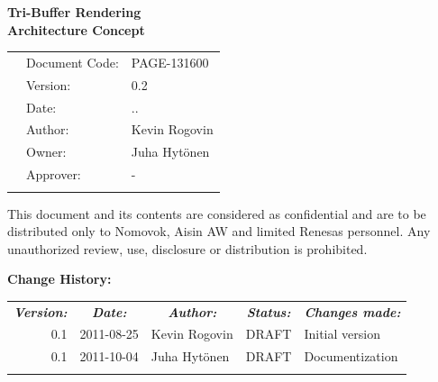 \documentclass[a4paper,11pt]{article}
\renewcommand{\dateseparator}{.}
\newcommand{\todayiso}{\twodigit\day\dateseparator\twodigit\month\dateseparator\the\year}
\begin{document}
\begin{center}

\vspace*{105.5pt}
{\LARGE \bf Tri-Buffer Rendering}\\
{\LARGE \bf Architecture Concept}\\
\vspace{71pt}

{
\begin{tabular}{lll}
  &Document Code: & PAGE-131600 \\ 
  &Version: & 0.2 \\ 
  &Date: & \todayiso \\ 
  &Author: & Kevin Rogovin \\ 
  &Owner: & Juha Hytönen \\ 
  &Approver: & - \\
  \multicolumn{1}{p{3.83cm}}{} &
  \multicolumn{1}{p{4.17cm}}{} & 
  \multicolumn{1}{p{8.00cm}}{}\\
\end{tabular}
}

\small
This document and its contents are considered as confidential and are to be distributed only to Nomovok, Aisin AW and limited Renesas personnel. 
Any unauthorized review, use, disclosure or distribution is prohibited. 

\end{center}

\newpage

\noindent\textbf{Change History:}
\label{sec:changelog}
\begin{table}[h!tbp]
  \begin{tabular}{rllll}
    \multicolumn{1}{c}{\textbf{\textit{Version:}}}& 
    \multicolumn{1}{c}{\textbf{\textit{Date:}}} & 
    \multicolumn{1}{c}{\textbf{\textit{Author:}}} &
    \multicolumn{1}{c}{\textbf{\textit{Status:}}} &
    \multicolumn{1}{c}{\textbf{\textit{Changes made:}}}\\
    0.1 & 2011-08-25 & Kevin Rogovin & DRAFT & Initial version \\
    0.1 & 2011-10-04 & Juha Hytönen & DRAFT & Documentization \\
    \multicolumn{1}{p{1.8cm}}{}&
    \multicolumn{1}{p{2.18cm}}{}&
    \multicolumn{1}{p{3.42cm}}{}&
    \multicolumn{1}{p{2.31cm}}{}&
    \multicolumn{1}{p{6.2cm}}{}\\
  \end{tabular}
\end{table}
\end{document}

